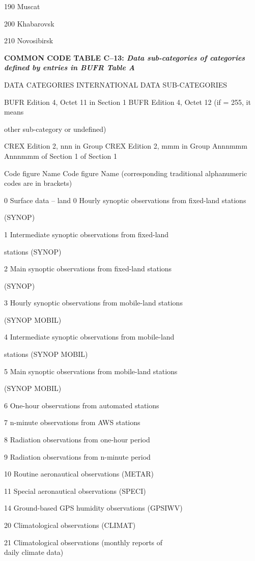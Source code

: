 190 Muscat

200 Khabarovsk

210 Novosibirsk

\textbf{COMMON CODE TABLE C--13: \emph{Data sub-categories of categories defined by entries in BUFR Table A}}

DATA CATEGORIES INTERNATIONAL DATA SUB-CATEGORIES

BUFR Edition 4, Octet 11 in Section 1 BUFR Edition 4, Octet 12 (if = 255, it means

other sub-category or undefined)

CREX Edition 2, nnn in Group CREX Edition 2, mmm in Group Annnmmm\\
Annnmmm of Section 1 of Section 1

Code figure Name Code figure Name (corresponding traditional alphanumeric\\
codes are in brackets)

0 Surface data -- land 0 Hourly synoptic observations from fixed-land stations

(SYNOP)

1 Intermediate synoptic observations from fixed-land

stations (SYNOP)

2 Main synoptic observations from fixed-land stations

(SYNOP)

3 Hourly synoptic observations from mobile-land stations

(SYNOP MOBIL)

4 Intermediate synoptic observations from mobile-land

stations (SYNOP MOBIL)

5 Main synoptic observations from mobile-land stations

(SYNOP MOBIL)

6 One-hour observations from automated stations

7 n-minute observations from AWS stations

8 Radiation observations from one-hour period

9 Radiation observations from n-minute period

10 Routine aeronautical observations (METAR)

11 Special aeronautical observations (SPECI)

14 Ground-based GPS humidity observations (GPSIWV)

20 Climatological observations (CLIMAT)

21 Climatological observations (monthly reports of\\
daily climate data)

